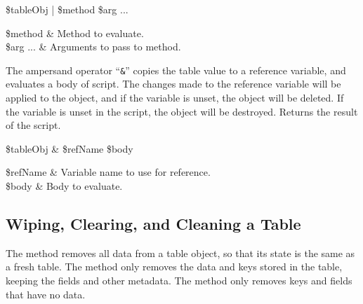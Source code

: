 \begin{syntax}
 \$tableObj | \$method \$arg ...
\end{syntax}

\begin{args}
\$method & Method to evaluate. \\
\$arg ... & Arguments to pass to method.
\end{args}

The ampersand operator ``\texttt{\&}'' copies the table value to a reference variable, and evaluates a body of script. 
The changes made to the reference variable will be applied to the object, and if the variable is unset, the object will be deleted.
If the variable is unset in the script, the object will be destroyed.
Returns the result of the script.

\begin{syntax}
 \$tableObj \& \$refName \$body
\end{syntax}
\begin{args}
\$refName & Variable name to use for reference. \\
\$body & Body to evaluate.
\end{args}

\clearpage


\subsection{Wiping, Clearing, and Cleaning a Table}
The method  removes all data from a table object, so that its state is the same as a fresh table.
The method  only removes the data and keys stored in the table, keeping the fields and other metadata.
The method  only removes keys and fields that have no data.
\begin{syntax}
\end{syntax}
\begin{syntax}
\end{syntax}
\begin{syntax}
\end{syntax}

